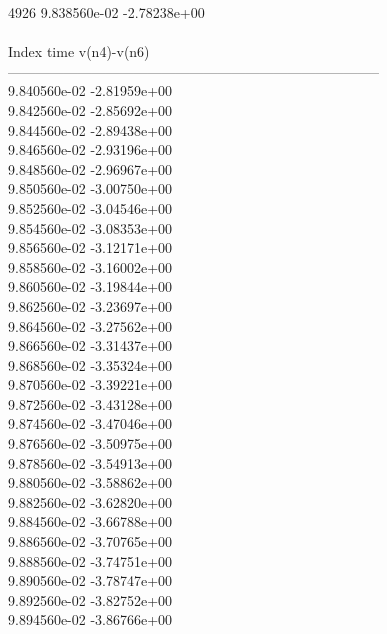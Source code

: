 4926	9.838560e-02	-2.78238e+00	\\ \hline
\\ \hline
Index   time            v(n4)-v(n6)     \\ \hline
--------------------------------------------------------------------------------\\ 	9.840560e-02	-2.81959e+00	\\ 	9.842560e-02	-2.85692e+00	\\ 	9.844560e-02	-2.89438e+00	\\ 	9.846560e-02	-2.93196e+00	\\ 	9.848560e-02	-2.96967e+00	\\ 	9.850560e-02	-3.00750e+00	\\ 	9.852560e-02	-3.04546e+00	\\ 	9.854560e-02	-3.08353e+00	\\ 	9.856560e-02	-3.12171e+00	\\ 	9.858560e-02	-3.16002e+00	\\ 	9.860560e-02	-3.19844e+00	\\ 	9.862560e-02	-3.23697e+00	\\ 	9.864560e-02	-3.27562e+00	\\ 	9.866560e-02	-3.31437e+00	\\ 	9.868560e-02	-3.35324e+00	\\ 	9.870560e-02	-3.39221e+00	\\ 	9.872560e-02	-3.43128e+00	\\ 	9.874560e-02	-3.47046e+00	\\ 	9.876560e-02	-3.50975e+00	\\ 	9.878560e-02	-3.54913e+00	\\ 	9.880560e-02	-3.58862e+00	\\ 	9.882560e-02	-3.62820e+00	\\ 	9.884560e-02	-3.66788e+00	\\ 	9.886560e-02	-3.70765e+00	\\ 	9.888560e-02	-3.74751e+00	\\ 	9.890560e-02	-3.78747e+00	\\ 	9.892560e-02	-3.82752e+00	\\ 	9.894560e-02	-3.86766e+00	\\ \hline

